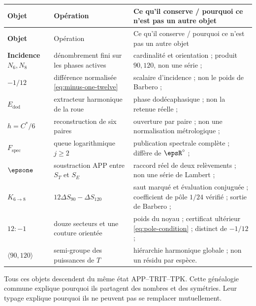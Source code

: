 \begin{longtable}{>{\bfseries}p{} p{} p{}}
\toprule
Objet & Opération & Ce qu'il conserve / pourquoi ce n'est pas un autre objet\\
\midrule
\endfirsthead
\toprule
Objet & Opération & Ce qu'il conserve / pourquoi ce n'est pas un autre objet\\
\midrule
\endhead
Incidence \(N_6,N_8\) & dénombrement fini sur les phases actives & cardinalité et orientation ; produit \(90,120\), non une série ;\\
\(-1/12\) & différence normalisée \eqref{eq:minus-one-twelve} & scalaire d'incidence ; non le poids de Barbero ;\\
\(E_{\mathrm{dod}}\) & extracteur harmonique de la roue & phase dodécaphasique ; non la retenue réelle ;\\
\(h=C^*/6\) & reconstruction de six paires & ouverture par paire ; non une normalisation métrologique ;\\
\(F_{\mathrm{spec}}\) & queue logarithmique \(j\ge2\) & publication spectrale complète ; diffère de \(\epsR^\circ\) ;\\
\(\epsone\) & soustraction APP entre \(S_T\) et \(S_E\) & raccord réel de deux relèvements ; non une série de Lambert ;\\
\(K_{6\to8}\) & \(12\Delta S_{90}-\Delta S_{120}\) & saut marqué et évaluation conjuguée ; coefficient de pôle \(1/24\) vérifié ; sortie de Barbero ;\\
\(12:-1\) & douze secteurs et une couture orientée & poids du noyau ; certificat ultérieur \eqref{eq:pole-condition} ; distinct de \(-1/12\) ;\\
\(\langle90,120\rangle\) & semi-groupe des puissances de \(T\) & hiérarchie harmonique globale ; non un résidu par espèce.\\
\bottomrule
\end{longtable}

\begin{thesisbox}
Tous ces objets descendent du même état APP--TRIT--TPK. Cette généalogie
commune explique pourquoi ils partagent des nombres et des symétries. Leur typage explique pourquoi
ils ne peuvent pas se remplacer mutuellement.
\end{thesisbox}
